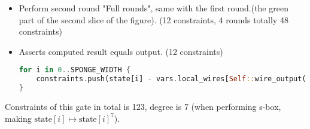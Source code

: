 \begin{itemize}
\begin{itemize}
\begin{itemize}
        \end{itemize}
    \end{itemize}
    \item Perform second round "Full rounds", same with the first round.(the green part of the second slice of the figure). (12 constraints, 4 rounds totally 48 constraints)
    \item Asserts computed result equals output. (12 constraints)
    \begin{lstlisting}[language=rust]
for i in 0..SPONGE_WIDTH {
    constraints.push(state[i] - vars.local_wires[Self::wire_output(i)]);
}
    \end{lstlisting}
\end{itemize}

Constraints of this gate in total is 123, degree is 7 (when performing s-box, making $\text{state}[i] \mapsto \text{state}[i]^7$).
